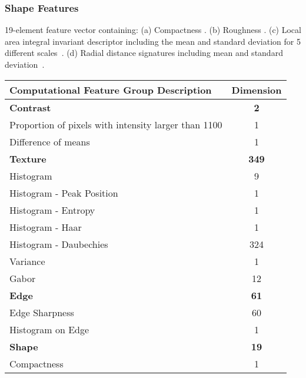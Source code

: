 \subsubsection{Shape Features}
19-element feature vector containing: (a) Compactness \cite{Duda:1973ul}. (b) Roughness \cite{Kilday:1993jk}. (c) Local area integral invariant descriptor including the mean and standard deviation for 5 different scales~\cite{Hong:2006ti,Manay:2006un}. (d) Radial distance signatures including mean and standard deviation~\cite{MRangayyan:2005td}.

\begin{table}
	\centering
	\begin{tabular}{|l|c|}
		\hline
		Computational Feature Group Description & Dimension \\ \hline \hline
		\textbf{Contrast} & \textbf{2} \\ \hline
		\hspace{2pt} Proportion of pixels with intensity larger than 1100 & 1 \\ \hline
		\hspace{2pt} Difference of means & 1 \\ \hline
		\textbf{Texture} & \textbf{349} \\ \hline
		\hspace{2pt} Histogram & 9 \\ \hline
		\hspace{2pt} Histogram - Peak Position & 1 \\ \hline
		\hspace{2pt} Histogram - Entropy & 1 \\ \hline
		\hspace{2pt} Histogram - Haar & 1 \\ \hline
		\hspace{2pt} Histogram - Daubechies & 324 \\ \hline
		\hspace{2pt} Variance & 1 \\ \hline
		\hspace{2pt} Gabor & 12 \\ \hline
		\textbf{Edge} & \textbf{61} \\ \hline
		\hspace{2pt} Edge Sharpness & 60 \\ \hline
		\hspace{2pt} Histogram on Edge & 1 \\ \hline
		\textbf{Shape} & \textbf{19} \\ \hline
		\hspace{2pt} Compactness & 1 \\ \hline

\end{tabular}
\end{table}
